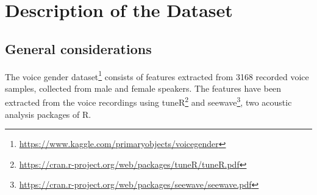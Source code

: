 \chapter{Description of the Dataset}
\label{chap:dataset}

\section{General considerations}
\label{sec:gen_cons}
The voice gender dataset\footnote{\url{https://www.kaggle.com/primaryobjects/voicegender}} consists of features extracted from \num{3168} recorded voice samples, collected from male and female speakers. 
The features have been extracted from the voice recordings using tuneR\footnote{\url{https://cran.r-project.org/web/packages/tuneR/tuneR.pdf}} and seewave\footnote{\url{https://cran.r-project.org/web/packages/seewave/seewave.pdf}}, two acoustic analysis packages of R.

